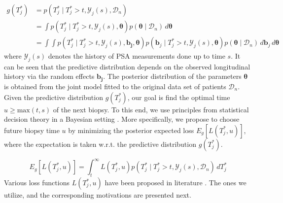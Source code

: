 \begin{equation}
\label{eq : dyn_dist_fail_time}
\begin{split}
g(T^*_j) &= p(T^*_j \mid T^*_j > t, \mathcal{Y}_j(s), \mathcal{D}_n)\\
&= \int p(T^*_j \mid T^*_j > t, \mathcal{Y}_j(s), \boldsymbol{\theta}) p(\boldsymbol{\theta} \mid \mathcal{D}_n) \,d\boldsymbol{\theta}\\
&= \int \int p(T^*_j \mid T^*_j > t, \mathcal{Y}_j(s), \boldsymbol{b_j}, \boldsymbol{\theta}) p(\boldsymbol{b}_j \mid T^*_j>t, \mathcal{Y}_j(s), \boldsymbol{\theta})p(\boldsymbol{\theta} \mid \mathcal{D}_n) \,d\boldsymbol{b}_j \,d\boldsymbol{\theta}
\end{split}
\end{equation}
where $\mathcal{Y}_j(s)$ denotes the history of PSA measurements done up to time $s$. It can be seen that the predictive distribution depends on the observed longitudinal history via the random effects $\boldsymbol{b_j}$. The posterior distribution of the parameters $\boldsymbol{\theta}$ is obtained from the joint model fitted to the original data set of patients $\mathcal{D}_n$.\\

Given the predictive distribution $g(T^*_j)$, our goal is find the optimal time $u \geq \text{max}(t,s)$ of the next biopsy. To this end, we use principles from statistical decision theory in a Bayesian setting \citep{bergerDecisionTheory,robertBayesianChoice}. More specifically, we propose to choose future biopsy time $u$ by minimizing the posterior expected loss $E_g[L(T^*_j, u)]$, where the expectation is taken w.r.t. the predictive distribution $g(T^*_j)$. 

\begin{equation*}
E_g[L(T^*_j, u)] = \int_t^\infty L(T^*_j, u) p(T^*_j \mid T^*_j > t, \mathcal{Y}_j(s), \mathcal{D}_n) \,dT^*_j
\end{equation*}
Various loss functions $L(T^*_j, u)$ have been proposed in literature \citep{robertBayesianChoice}. The ones we utilize, and the corresponding motivations are presented next.

